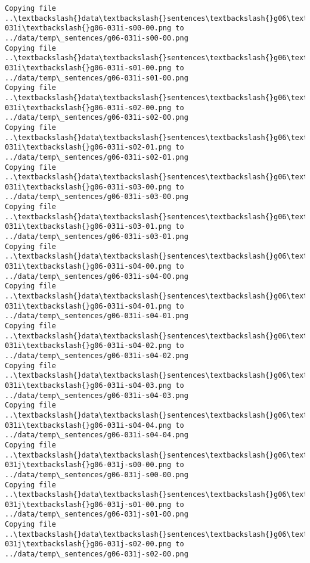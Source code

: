\documentclass[11pt]{article}
\begin{document}
\begin{Verbatim}[commandchars=\\\{\}]
Copying file ..\textbackslash{}data\textbackslash{}sentences\textbackslash{}g06\textbackslash{}g06-031i\textbackslash{}g06-031i-s00-00.png to
../data/temp\_sentences/g06-031i-s00-00.png
Copying file ..\textbackslash{}data\textbackslash{}sentences\textbackslash{}g06\textbackslash{}g06-031i\textbackslash{}g06-031i-s01-00.png to
../data/temp\_sentences/g06-031i-s01-00.png
Copying file ..\textbackslash{}data\textbackslash{}sentences\textbackslash{}g06\textbackslash{}g06-031i\textbackslash{}g06-031i-s02-00.png to
../data/temp\_sentences/g06-031i-s02-00.png
Copying file ..\textbackslash{}data\textbackslash{}sentences\textbackslash{}g06\textbackslash{}g06-031i\textbackslash{}g06-031i-s02-01.png to
../data/temp\_sentences/g06-031i-s02-01.png
Copying file ..\textbackslash{}data\textbackslash{}sentences\textbackslash{}g06\textbackslash{}g06-031i\textbackslash{}g06-031i-s03-00.png to
../data/temp\_sentences/g06-031i-s03-00.png
Copying file ..\textbackslash{}data\textbackslash{}sentences\textbackslash{}g06\textbackslash{}g06-031i\textbackslash{}g06-031i-s03-01.png to
../data/temp\_sentences/g06-031i-s03-01.png
Copying file ..\textbackslash{}data\textbackslash{}sentences\textbackslash{}g06\textbackslash{}g06-031i\textbackslash{}g06-031i-s04-00.png to
../data/temp\_sentences/g06-031i-s04-00.png
Copying file ..\textbackslash{}data\textbackslash{}sentences\textbackslash{}g06\textbackslash{}g06-031i\textbackslash{}g06-031i-s04-01.png to
../data/temp\_sentences/g06-031i-s04-01.png
Copying file ..\textbackslash{}data\textbackslash{}sentences\textbackslash{}g06\textbackslash{}g06-031i\textbackslash{}g06-031i-s04-02.png to
../data/temp\_sentences/g06-031i-s04-02.png
Copying file ..\textbackslash{}data\textbackslash{}sentences\textbackslash{}g06\textbackslash{}g06-031i\textbackslash{}g06-031i-s04-03.png to
../data/temp\_sentences/g06-031i-s04-03.png
Copying file ..\textbackslash{}data\textbackslash{}sentences\textbackslash{}g06\textbackslash{}g06-031i\textbackslash{}g06-031i-s04-04.png to
../data/temp\_sentences/g06-031i-s04-04.png
Copying file ..\textbackslash{}data\textbackslash{}sentences\textbackslash{}g06\textbackslash{}g06-031j\textbackslash{}g06-031j-s00-00.png to
../data/temp\_sentences/g06-031j-s00-00.png
Copying file ..\textbackslash{}data\textbackslash{}sentences\textbackslash{}g06\textbackslash{}g06-031j\textbackslash{}g06-031j-s01-00.png to
../data/temp\_sentences/g06-031j-s01-00.png
Copying file ..\textbackslash{}data\textbackslash{}sentences\textbackslash{}g06\textbackslash{}g06-031j\textbackslash{}g06-031j-s02-00.png to
../data/temp\_sentences/g06-031j-s02-00.png

\end{Verbatim}
\end{document}
